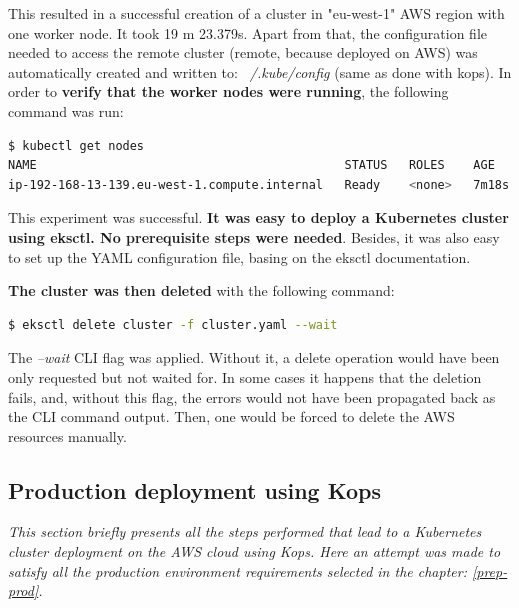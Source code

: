 This resulted in a successful creation of a cluster in "eu-west-1" AWS region with one worker node. It took 19 m 23.379s. Apart from that, the configuration file needed to access the remote cluster (remote, because deployed on AWS) was automatically created and written to: \textit{~/.kube/config} (same as done with kops). In order to \textbf{verify that the worker nodes were running}, the following command was run:
\begin{lstlisting}[basicstyle=\tiny,caption={Command used to list Kubernetes worker nodes to verify that one such node was running},captionpos=b,language=Bash,xleftmargin=1cm]
$ kubectl get nodes
NAME                                           STATUS   ROLES    AGE     VERSION
ip-192-168-13-139.eu-west-1.compute.internal   Ready    <none>   7m18s   v1.16.8-eks-e16311
\end{lstlisting}

This experiment was successful. \textbf{It was easy to deploy a Kubernetes cluster using eksctl. No prerequisite steps were needed}. Besides, it was also easy to set up the YAML configuration file, basing on the eksctl documentation\cite{eksctl-creating-clusters}.


\textbf{The cluster was then deleted} with the following command:
\begin{lstlisting}[basicstyle=\tiny,caption={Command used to delete Kubernetes cluster with eksctl},captionpos=b,language=Bash,xleftmargin=1cm]
$ eksctl delete cluster -f cluster.yaml --wait
\end{lstlisting}

The \textit{--wait} CLI flag was applied. Without it, a delete operation would have been only requested but not waited for. In some cases it happens that the deletion fails, and, without this flag, the errors would not have been propagated back as the CLI command output. Then, one would be forced to delete the AWS resources manually\cite{eksctl-creating-clusters}.


\subsection{Production deployment using Kops}
\textit{This section briefly presents all the steps performed that lead to a Kubernetes cluster deployment on the AWS cloud using Kops. Here an attempt was made to satisfy all the production environment requirements selected in the chapter: \ref{prep-prod}.}
\\

